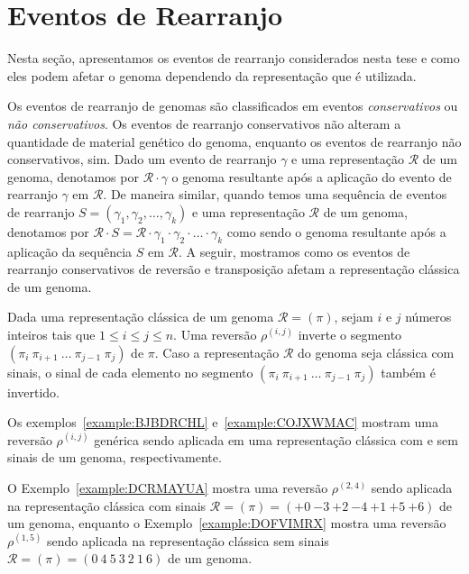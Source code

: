 \section{Eventos de Rearranjo}

Nesta seção, apresentamos os eventos de rearranjo considerados nesta tese e como eles podem afetar o genoma dependendo da representação que é utilizada. 

Os eventos de rearranjo de genomas são classificados em eventos \emph{conservativos} ou \emph{não conservativos}. Os eventos de rearranjo conservativos não alteram a quantidade de material genético do genoma, enquanto os eventos de rearranjo não conservativos, sim. Dado um evento de rearranjo $\gamma$ e uma representação $\mathcal{R}$ de um genoma, denotamos por $\mathcal{R} \cdot  \gamma$ o genoma resultante após a aplicação do evento de rearranjo $\gamma$ em $\mathcal{R}$. De maneira similar, quando temos uma sequência de eventos de rearranjo $S=(\gamma_1,\gamma_2,\dots,\gamma_k)$ e uma representação $\mathcal{R}$ de um genoma, denotamos por $\mathcal{R} \cdot S = \mathcal{R} \cdot \gamma_1 \cdot \gamma_2 \cdot \ldots \cdot \gamma_k$ como sendo o genoma resultante após a aplicação da sequência $S$ em $\mathcal{R}$. A seguir, mostramos como os eventos de rearranjo conservativos de reversão e transposição afetam a representação clássica de um genoma.

\begin{definition}
Dada uma representação clássica de um genoma $\mathcal{R} = (\pi)$, sejam $i$ e $j$ números inteiros tais que $1 \le i \le j \le n$. Uma reversão $\rho^{(i,j)}$ inverte o segmento $(\pi_i~\pi_{i+1}~\dots~\pi_{j-1}~\pi_j)$ de $\pi$. Caso a representação $\mathcal{R}$ do genoma seja clássica com sinais, o sinal de cada elemento no segmento $(\pi_i~\pi_{i+1}~\dots~\pi_{j-1}~\pi_j)$ também é invertido.
\end{definition}

Os exemplos~\ref{example:BJBDRCHL} e~\ref{example:COJXWMAC} mostram uma reversão $\rho^{(i,j)}$ genérica sendo aplicada em uma representação clássica com e sem sinais de um genoma, respectivamente.





O Exemplo~\ref{example:DCRMAYUA} mostra uma reversão $\rho^{(2,4)}$ sendo aplicada na representação clássica com sinais $\mathcal{R} = (\pi) = ({+0}~{-3}~{+2}~{-4}~{+1}~{+5}~{+6})$ de um genoma, enquanto o Exemplo~\ref{example:DOFVIMRX} mostra uma reversão $\rho^{(1,5)}$ sendo aplicada na representação clássica sem sinais $\mathcal{R} = (\pi) = ({0}~{4}~{5}~{3}~{2}~{1}~{6})$ de um genoma.

